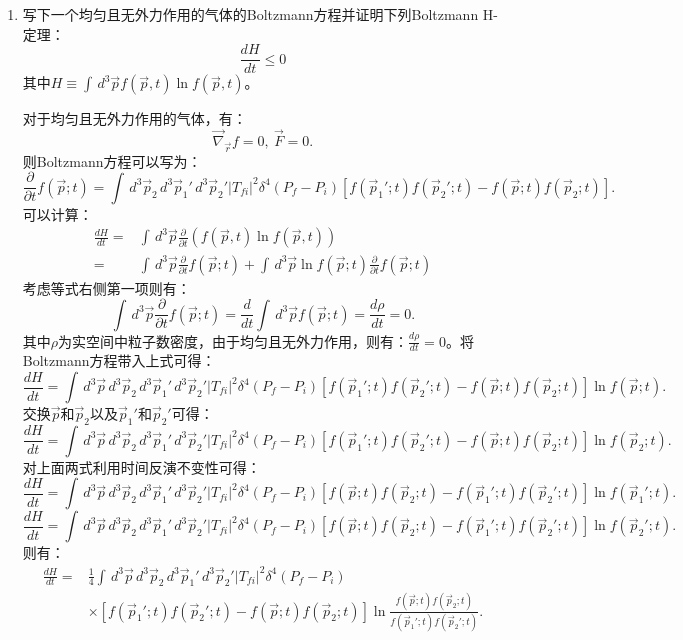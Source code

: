 \documentclass[reqno,a4paper,12pt]{amsart}
\begin{document}
\begin{enumerate}[1.]
\item 写下一个均匀且无外力作用的气体的Boltzmann方程并证明下列Boltzmann H-定理：
\[
	\frac{dH}{dt} \leq 0
\]
其中$H \equiv \int \,d^3\vec{p} f(\vec{p},t)\ln f(\vec{p},t)$。
\begin{tcolorbox}[breakable, colback = black!5!white, colframe = black]
对于均匀且无外力作用的气体，有：
\[
	\vec{\nabla}_{\vec{r}}f = 0, ~ \vec{F} = 0.
\]
则Boltzmann方程可以写为：
\[
	\frac{\partial}{\partial t} f(\vec{p};t) = \int \,d^3\vec{p}_2\,d^3\vec{p}_1'\,d^3\vec{p}_2' \vert T_{fi} \vert^2 \delta^4(P_f-P_i) [f(\vec{p}_1';t)f(\vec{p}_2';t) - f(\vec{p};t)f(\vec{p}_2;t)].
\]
可以计算：
\begin{align*}
	\frac{dH}{dt} =& \int \,d^3\vec{p} \frac{\partial}{\partial t} ( f(\vec{p},t)\ln f(\vec{p},t) ) \\
	=& \int \,d^3\vec{p} \frac{\partial}{\partial t} f(\vec{p};t) + \int \,d^3\vec{p} \ln f(\vec{p};t) \frac{\partial}{\partial t}f(\vec{p};t) 
\end{align*}
考虑等式右侧第一项则有：
\[
	\int \,d^3\vec{p} \frac{\partial}{\partial t} f(\vec{p};t) = \frac{d}{dt} \int \,d^3\vec{p} f(\vec{p};t) = \frac{d\rho}{dt} = 0.
\]
其中$\rho$为实空间中粒子数密度，由于均匀且无外力作用，则有：$\frac{d\rho}{dt} = 0$。将Boltzmann方程带入上式可得：
\[
	\frac{dH}{dt} = \int \,d^3\vec{p} \,d^3\vec{p}_2 \,d^3\vec{p}_1' \,d^3\vec{p}_2' \vert T_{fi} \vert^2 \delta^4(P_f-P_i) [f(\vec{p}_1';t)f(\vec{p}_2';t) - f(\vec{p};t)f(\vec{p}_2;t)] \ln f(\vec{p};t).
\]
交换$\vec{p}$和$\vec{p}_2$以及$\vec{p}_1'$和$\vec{p}_2'$可得：
\[
	\frac{dH}{dt} = \int \,d^3\vec{p} \,d^3\vec{p}_2 \,d^3\vec{p}_1' \,d^3\vec{p}_2' \vert T_{fi} \vert^2 \delta^4(P_f-P_i) [f(\vec{p}_1';t)f(\vec{p}_2';t) - f(\vec{p};t)f(\vec{p}_2;t)] \ln f(\vec{p}_2;t).
\]
对上面两式利用时间反演不变性可得：
\[
	\frac{dH}{dt} = \int \,d^3\vec{p} \,d^3\vec{p}_2 \,d^3\vec{p}_1' \,d^3\vec{p}_2' \vert T_{fi} \vert^2 \delta^4(P_f-P_i) [f(\vec{p};t)f(\vec{p}_2;t) - f(\vec{p}_1';t)f(\vec{p}_2';t)] \ln f(\vec{p}_1';t).
\]
\[
	\frac{dH}{dt} = \int \,d^3\vec{p} \,d^3\vec{p}_2 \,d^3\vec{p}_1' \,d^3\vec{p}_2' \vert T_{fi} \vert^2 \delta^4(P_f-P_i) [f(\vec{p};t)f(\vec{p}_2;t) - f(\vec{p}_1';t)f(\vec{p}_2';t)] \ln f(\vec{p}_2';t).
\]
则有：
\begin{align*}
	\frac{dH}{dt} =& \frac{1}{4} \int \,d^3\vec{p} \,d^3\vec{p}_2 \,d^3\vec{p}_1' \,d^3\vec{p}_2' \vert T_{fi} \vert^2 \delta^4(P_f-P_i) \\
	&\times[f(\vec{p}_1';t)f(\vec{p}_2';t) - f(\vec{p};t)f(\vec{p}_2;t)] \ln \frac{f(\vec{p};t)f(\vec{p}_2;t)}{f(\vec{p}_1';t)f(\vec{p}_2';t)}.

\end{align*}
\end{tcolorbox}
\end{enumerate}
\end{document}
